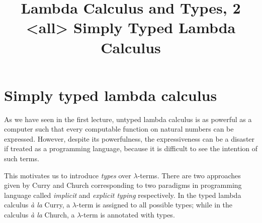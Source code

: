 \title{Lambda Calculus and Types, 2 \\<all>
  Simply Typed Lambda Calculus}

\begin{frame}
\maketitle
\end{frame}

\section{Simply typed lambda calculus}
As we have seen in the first lecture, untyped lambda calculus is as powerful as
a computer such that every computable function on natural numbers can be
expressed. However, despite its powerfulness, the expressiveness can be a
disaster if treated as a programming language, because it is difficult to see
the intention of such terms. 

This motivates us to introduce \emph{types} over $\lambda$-terms. There are two
approaches given by Curry and Church corresponding to two paradigms in
programming language called \emph{implicit} and \emph{explicit typing}
respectively.  In the typed lambda calculus \textit{\`a la} Curry, a
$\lambda$-term is assigned to all possible types; while in the calculus
\textit{\`a la} Church, a $\lambda$-term is annotated with types. 

